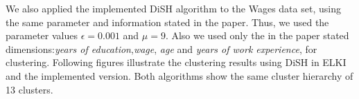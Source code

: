 \documentclass{article}
\begin{document}
\begin{figure}[h!]
\centering
\end{figure}


We also applied the implemented DiSH algorithm to the Wages data set, using the same parameter and information stated in the paper. Thus, we used the parameter values $\epsilon = 0.001$ and $\mu = 9$. Also we used only the in the paper stated dimensions:\emph{years of education},\emph{wage}, \emph{age} and \emph{years of work experience}, for clustering. Following figures illustrate the clustering results using DiSH in ELKI and the implemented version. Both algorithms show the same cluster hierarchy of 13 clusters. 
\end{document}
